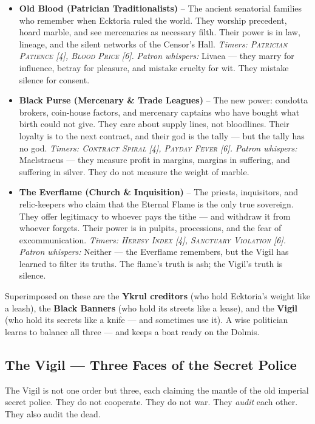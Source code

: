 \begin{itemize}[leftmargin=*]
    \item \textbf{Old Blood (Patrician Traditionalists)} -- The ancient senatorial families who remember when Ecktoria ruled the world. They worship precedent, hoard marble, and see mercenaries as necessary filth. Their power is in law, lineage, and the silent networks of the Censor's Hall.  
    \emph{Timers: \textsc{Patrician Patience} [4], \textsc{Blood Price} [6].}  
    \emph{Patron whispers:} Livaea --- they marry for influence, betray for pleasure, and mistake cruelty for wit. They mistake silence for consent.

    \item \textbf{Black Purse (Mercenary \& Trade Leagues)} -- The new power: condotta brokers, coin-house factors, and mercenary captains who have bought what birth could not give. They care about supply lines, not bloodlines. Their loyalty is to the next contract, and their god is the tally --- but the tally has no god.  
    \emph{Timers: \textsc{Contract Spiral} [4], \textsc{Payday Fever} [6].}  
    \emph{Patron whispers:} Maelstraeus --- they measure profit in margins, margins in suffering, and suffering in silver. They do not measure the weight of marble.

    \item \textbf{The Everflame (Church \& Inquisition)} -- The priests, inquisitors, and relic-keepers who claim that the Eternal Flame is the only true sovereign. They offer legitimacy to whoever pays the tithe --- and withdraw it from whoever forgets. Their power is in pulpits, processions, and the fear of excommunication.  
    \emph{Timers: \textsc{Heresy Index} [4], \textsc{Sanctuary Violation} [6].}  
    \emph{Patron whispers:} Neither --- the Everflame remembers, but the Vigil has learned to filter its truths. The flame's truth is ash; the Vigil's truth is silence.
\end{itemize}

Superimposed on these are the \textbf{Ykrul creditors} (who hold Ecktoria's weight like a leash), the \textbf{Black Banners} (who hold its streets like a lease), and the \textbf{Vigil} (who hold its secrets like a knife --- and sometimes use it). A wise politician learns to balance all three --- and keeps a boat ready on the Dolmis.

\subsection*{The Vigil --- Three Faces of the Secret Police}
The Vigil is not one order but three, each claiming the mantle of the old imperial secret police. They do not cooperate. They do not war. They \emph{audit} each other. They also audit the dead.

